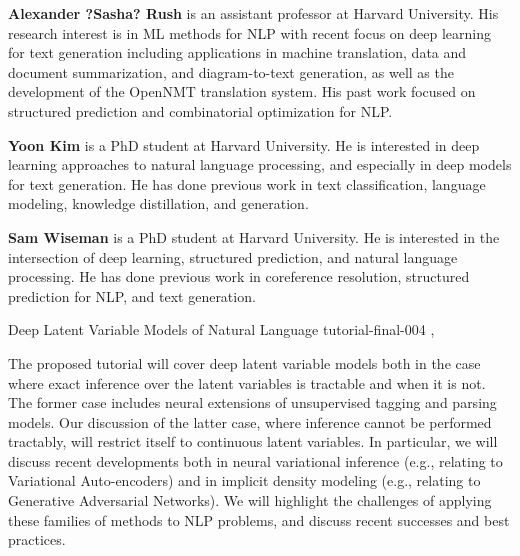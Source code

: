 \begin{bio}

\textbf{Alexander ?Sasha? Rush} is an assistant professor at Harvard University. His research interest is in ML
methods for NLP with recent focus on deep learning for text generation including applications in machine
translation, data and document summarization, and diagram-to-text generation, as well as the development
of the OpenNMT translation system. His past work focused on structured prediction and combinatorial
optimization for NLP.

\textbf{Yoon Kim} is a PhD student at Harvard University. He is interested in deep learning approaches to natural
language processing, and especially in deep models for text generation. He has done previous work in text
classification, language modeling, knowledge distillation, and generation.

\textbf{Sam Wiseman} is a PhD student at Harvard University. He is interested in the intersection of deep learning,
structured prediction, and natural language processing. He has done previous work in coreference
resolution, structured prediction for NLP, and text generation.

\end{bio}

\begin{tutorial}
  {Deep Latent Variable Models of Natural Language}
  {tutorial-final-004}
  {, \tutorialmorningtime}
  {\TutLocD}

The proposed tutorial will cover deep latent variable models both in the case where exact inference over the latent variables is tractable and when it is not. The former case includes neural extensions of unsupervised tagging and parsing models. Our discussion of the latter case, where inference cannot be performed tractably, will restrict itself to continuous latent variables. In particular, we will discuss recent developments both in neural variational inference (e.g., relating to Variational Auto-encoders) and in implicit density modeling (e.g., relating to Generative Adversarial Networks). We will highlight the challenges of applying these families of methods to NLP problems, and discuss recent successes and best practices.

\end{tutorial}
